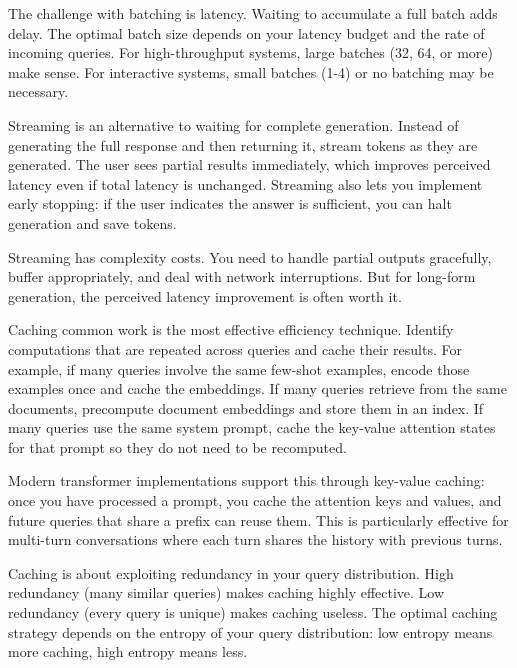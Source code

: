 The challenge with batching is latency. Waiting to accumulate a full batch adds delay. The optimal batch size depends on your latency budget and the rate of incoming queries. For high-throughput systems, large batches (32, 64, or more) make sense. For interactive systems, small batches (1-4) or no batching may be necessary.

Streaming is an alternative to waiting for complete generation. Instead of generating the full response and then returning it, stream tokens as they are generated. The user sees partial results immediately, which improves perceived latency even if total latency is unchanged. Streaming also lets you implement early stopping: if the user indicates the answer is sufficient, you can halt generation and save tokens.

Streaming has complexity costs. You need to handle partial outputs gracefully, buffer appropriately, and deal with network interruptions. But for long-form generation, the perceived latency improvement is often worth it.

Caching common work is the most effective efficiency technique. Identify computations that are repeated across queries and cache their results. For example, if many queries involve the same few-shot examples, encode those examples once and cache the embeddings. If many queries retrieve from the same documents, precompute document embeddings and store them in an index. If many queries use the same system prompt, cache the key-value attention states for that prompt so they do not need to be recomputed.

Modern transformer implementations support this through key-value caching: once you have processed a prompt, you cache the attention keys and values, and future queries that share a prefix can reuse them. This is particularly effective for multi-turn conversations where each turn shares the history with previous turns.

\vspace{1.5em}

\begin{keyinsight}
Caching is about exploiting redundancy in your query distribution. High redundancy (many similar queries) makes caching highly effective. Low redundancy (every query is unique) makes caching useless. The optimal caching strategy depends on the entropy of your query distribution: low entropy means more caching, high entropy means less.
\end{keyinsight}

\vspace{1.5em}

